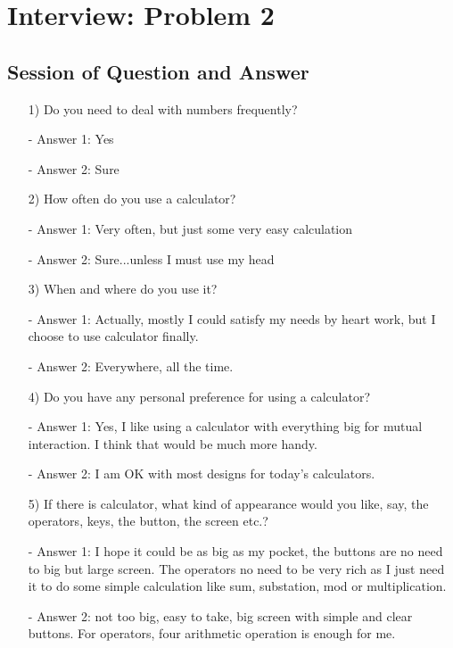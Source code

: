 \chapter{Interview: Problem 2}
\vspace{8pt}

\section{Session of Question and Answer}
 \begin{itemize}

\item[1)] Do you need to deal with numbers frequently?
\item[-]Answer 1: Yes
\item[-] Answer 2: Sure 

\item[2)]How often do you use a calculator?
\item[-]Answer 1: Very often, but just some very easy calculation
\item[-]Answer 2: Sure...unless I must use my head

\item[3)]When and where do you use it?
\item[-]Answer 1: Actually, mostly I could satisfy my needs by heart work, but I choose to use calculator finally.
\item[-]Answer 2: Everywhere, all the time.

\item[4)]Do you have any personal preference for using a calculator?
\item[-]Answer 1: Yes, I like using a calculator with everything big for mutual interaction. I think that would be much more handy.
\item[-]Answer 2: I am OK with most designs for today's calculators.


\item[5)]If there is calculator, what kind of appearance would you like, say, the operators, keys, the button, the screen etc.?
\item[-]Answer 1: I hope it could be as big as my pocket, the buttons are no need to big but large screen. The operators no need to be very rich as I just need it to do some simple calculation like sum, substation, mod or multiplication. 
\item[-]Answer 2: not too big, easy to take, big screen with simple and clear buttons. For operators, four arithmetic operation is enough for me.



\end{itemize}
